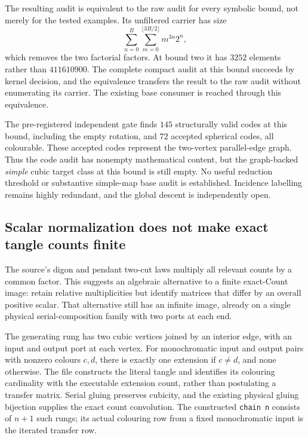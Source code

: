 The resulting audit is equivalent to the raw audit for every symbolic
bound, not merely for the tested examples.
Its unfiltered carrier has size
\[
 \sum_{n=0}^{B}\sum_{m=0}^{\lfloor3B/2\rfloor} m^{3n}2^n,
\]
which removes the two factorial factors. At bound two it has $3252$
elements rather than $411610900$.
The complete compact audit at this bound succeeds by kernel decision,
and the equivalence transfers the result to the raw audit without
enumerating its carrier.
The existing base consumer is reached through this equivalence.

The pre-registered independent gate finds $145$ structurally valid codes
at this bound, including the empty rotation, and $72$ accepted spherical
codes, all colourable. These accepted codes represent the two-vertex
parallel-edge graph. Thus the code audit has nonempty mathematical
content, but the graph-backed \emph{simple} cubic target class at this
bound is still empty. No useful reduction threshold or substantive
simple-map base audit is established. Incidence labelling remains highly
redundant, and the global descent is independently open.

\subsection{Scalar normalization does not make exact tangle counts finite}
\label{sec:projective-tangle-count}

The source's digon and pendant two-cut laws multiply all relevant counts
by a common factor. This suggests an algebraic alternative to a finite
exact-Count image: retain relative multiplicities but identify matrices
that differ by an overall positive scalar. That alternative still has an
infinite image, already on a single physical serial-composition family
with two ports at each end.

The generating rung has two cubic vertices joined by an interior edge,
with an input and output port at each vertex. For monochromatic input
and output pairs with nonzero colours $c,d$, there is exactly one extension
if $c\ne d$, and none otherwise. The file constructs the literal tangle
and identifies its colouring cardinality with the executable extension
count, rather than postulating a transfer matrix.
Serial gluing preserves cubicity, and the existing physical gluing
bijection supplies the exact count convolution.
The constructed \texttt{chain n} consists of $n+1$ such rungs; its actual
colouring row from a fixed monochromatic input is the iterated transfer
row.

